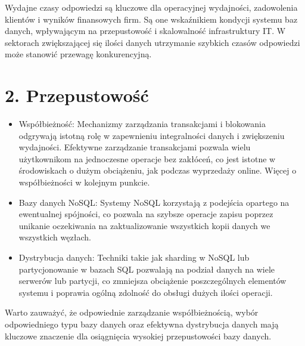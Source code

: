 \documentclass[letterpaper,10pt,polish]{sphinxmanual}
\begin{document}
\sphinxAtStartPar
Wydajne czasy odpowiedzi są kluczowe dla operacyjnej wydajności, zadowolenia klientów i wyników finansowych firm. Są one wskaźnikiem kondycji systemu baz danych, wpływającym na przepustowość i skalowalność infrastruktury IT. W sektorach zwiększającej się ilości danych utrzymanie szybkich czasów odpowiedzi może stanowić przewagę konkurencyjną.


\section{2. Przepustowość}
\label{\detokenize{rozdzialy/rozdzial3:przepustowosc}}\begin{description}
\begin{itemize}
\item {} 
\sphinxAtStartPar
Współbieżność: Mechanizmy zarządzania transakcjami i blokowania odgrywają istotną rolę w zapewnieniu integralności danych i zwiększeniu wydajności. Efektywne zarządzanie transakcjami pozwala wielu użytkownikom na jednoczesne operacje bez zakłóceń, co jest istotne w środowiskach o dużym obciążeniu, jak podczas wyprzedaży online. Więcej o współbieżności w kolejnym punkcie.

\item {} 
\sphinxAtStartPar
Bazy danych NoSQL: Systemy NoSQL korzystają z podejścia opartego na ewentualnej spójności, co pozwala na szybsze operacje zapisu poprzez unikanie oczekiwania na zaktualizowanie wszystkich kopii danych we wszystkich węzłach.

\item {} 
\sphinxAtStartPar
Dystrybucja danych: Techniki takie jak sharding w NoSQL lub partycjonowanie w bazach SQL pozwalają na podział danych na wiele serwerów lub partycji, co zmniejsza obciążenie poszczególnych elementów systemu i poprawia ogólną zdolność do obsługi dużych ilości operacji.

\end{itemize}

\end{description}

\sphinxAtStartPar
Warto zauważyć, że odpowiednie zarządzanie współbieżnością, wybór odpowiedniego typu bazy danych oraz efektywna dystrybucja danych mają kluczowe znaczenie dla osiągnięcia wysokiej przepustowości bazy danych.
\end{document}
